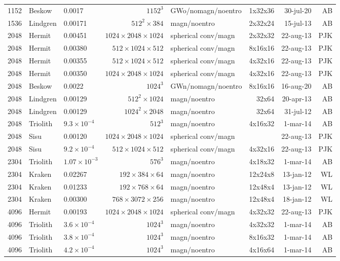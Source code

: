 \documentclass[\mydriver,12pt,twoside,notitlepage,a4paper]{article}
\begin{document}
\begin{center}
\begin{footnotesize}
\begin{longtable}{rllrlrrr}
1152&Beskow&0.0017 &$1152^3$&GWo/nomagn/noentro&1x32x36 &30-jul-20 & AB \\
1536&Lindgren&0.00171&$512^2{\!\times\!}384$&magn/noentro&2x32x24&15-jul-13& AB \\
2048&Hermit&0.00451&$1024{\!\times\!}2048{\!\times\!}1024$&spherical conv/magn&2x32x32&22-aug-13&PJK\\
2048&Hermit&0.00380&$512{\!\times\!}1024{\!\times\!}512$&spherical conv/magn&8x16x16&22-aug-13&PJK\\
2048&Hermit&0.00355&$512{\!\times\!}1024{\!\times\!}512$&spherical conv/magn&4x32x16&22-aug-13&PJK\\
2048&Hermit&0.00350&$1024{\!\times\!}2048{\!\times\!}1024$&spherical conv/magn&4x32x16&22-aug-13&PJK\\
2048&Beskow&0.0022 &$1024^3$&GWn/nomagn/noentro&8x16x16 &16-aug-20 & AB \\
2048&Lindgren&0.00129&$512^2{\!\times\!}1024$&magn/noentro&32x64&20-apr-13& AB \\
2048&Lindgren&0.00129&$1024^2{\!\times\!}2048$&magn/noentro&32x64&31-jul-12& AB \\
2048 &Triolith&  $9.3{\!\times\!}10^{-4}$ &$ 512^3$&magn/noentro&4x16x32& 1-mar-14 & AB  \\
2048&Sisu&0.00120&$1024{\!\times\!}2048{\!\times\!}1024$&spherical conv/magn& &22-aug-13&PJK\\
2048&Sisu&$9.2{\!\times\!}10^{-4}$&$512{\!\times\!}1024{\!\times\!}512$&spherical conv/magn&4x32x16&22-aug-13&PJK\\
2304&Triolith&$1.07{\!\times\!}10^{-3}$&$ 576^3$&magn/noentro&4x18x32& 1-mar-14 & AB \\
2304&Kraken&0.02267&$192{\!\times\!}384{\!\times\!}64$&magn/noentro&12x24x8&13-jan-12&WL\\
2304&Kraken&  0.01233 &$192{\!\times\!}768{\!\times\!}64$ & magn/noentro & 12x48x4 &13-jan-12 & WL\\
2304&Kraken& 0.00300  &$768{\!\times\!}3072{\!\times\!}256$ & magn/noentro & 12x48x4 &18-jan-12 & WL\\
4096&Hermit&0.00193&$1024{\!\times\!}2048{\!\times\!}1024$&spherical conv/magn&4x32x32&22-aug-13&PJK\\
4096&Triolith&$3.6{\!\times\!}10^{-4}$&$1024^3$&magn/noentro&4x32x32& 1-mar-14 & AB \\
4096&Triolith&$3.8{\!\times\!}10^{-4}$&$1024^3$&magn/noentro&8x16x32& 1-mar-14 & AB \\
4096&Triolith&$4.2{\!\times\!}10^{-4}$&$1024^3$&magn/noentro&4x16x64& 1-mar-14 & AB \\

\end{longtable}
\end{footnotesize}
\end{center}
\end{document}
